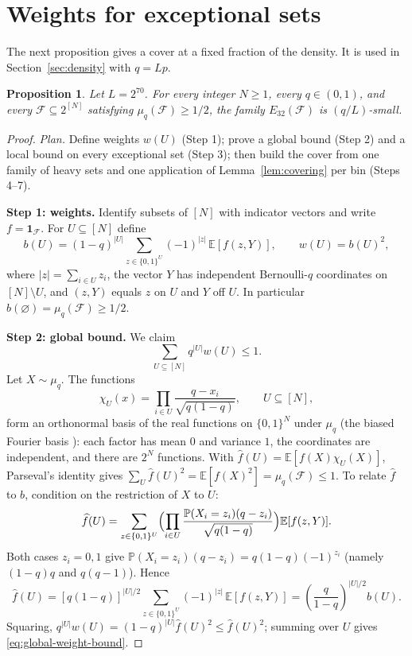 \documentclass[11pt,letterpaper]{article}
\newtheorem{proposition}[theorem]{Proposition}
\theoremstyle{definition}
\theoremstyle{remark}
\numberwithin{equation}{section}
\newcommand{\step}[1]{\par\smallskip\noindent\textbf{#1}\enspace}
\begin{document}
\section{Weights for exceptional sets}
\label{sec:weights}

The next proposition gives a cover at a fixed fraction of the density.
It is used in Section~\ref{sec:density} with $q=Lp$.

\begin{proposition}\label{prop:half-density}
Let $L=2^{70}$. For every integer $N\ge1$, every $q\in(0,1)$, and every
$\mathcal F\subseteq 2^{[N]}$ satisfying $\mu_q(\mathcal F)\ge1/2$,
the family $E_{32}(\mathcal F)$ is $(q/L)$-small.
\end{proposition}

\begin{proof}
\emph{Plan.} Define weights $w(U)$ (Step 1); prove a global bound
(Step 2) and a local bound on every exceptional set (Step 3); then build
the cover from one family of heavy sets and one application of
Lemma~\ref{lem:covering} per bin (Steps 4--7).

\step{Step 1: weights.}
Identify subsets of $[N]$ with indicator vectors and write
$f=\mathbf 1_{\mathcal F}$. For $U\subseteq[N]$ define
\begin{equation}\label{eq:weights-definition}
 b(U)=(1-q)^{|U|}
 \sum_{z\in\{0,1\}^{U}}(-1)^{|z|}\,
 \mathbb E[f(z,Y)],
 \qquad w(U)=b(U)^2,
\end{equation}
where $|z|=\sum_{i\in U}z_i$, the vector $Y$ has independent
Bernoulli-$q$ coordinates on $[N]\setminus U$, and $(z,Y)$ equals $z$ on
$U$ and $Y$ off $U$. In particular
$b(\varnothing)=\mu_q(\mathcal F)\ge1/2$.

\step{Step 2: global bound.} We claim
\begin{equation}\label{eq:global-weight-bound}
 \sum_{U\subseteq[N]}q^{|U|}w(U)\le1.
\end{equation}
Let $X\sim\mu_q$. The functions
\[
 \chi_U(x)=\prod_{i\in U}\frac{q-x_i}{\sqrt{q(1-q)}},
 \qquad U\subseteq[N],
\]
form an orthonormal basis of the real functions on $\{0,1\}^N$ under
$\mu_q$ (the biased Fourier basis \cite[Section~8.4]{ODonnell14}): each
factor has mean $0$ and variance $1$, the coordinates are independent,
and there are $2^N$ functions. With
$\widehat f(U)=\mathbb E[f(X)\chi_U(X)]$, Parseval's identity gives
$\sum_U\widehat f(U)^2=\mathbb E[f(X)^2]=\mu_q(\mathcal F)\le1$.
To relate $\widehat f$ to $b$, condition on the restriction of $X$ to $U$:
\[
 \widehat f(U)=\sum_{z\in\{0,1\}^U}
 \Bigl(\prod_{i\in U}\frac{\mathbb P(X_i=z_i)(q-z_i)}{\sqrt{q(1-q)}}\Bigr)
 \mathbb E[f(z,Y)].
\]
Both cases $z_i=0,1$ give
$\mathbb P(X_i=z_i)(q-z_i)=q(1-q)(-1)^{z_i}$ (namely $(1-q)q$ and
$q(q-1)$). Hence
\[
 \widehat f(U)
 =[q(1-q)]^{|U|/2}
 \sum_{z\in\{0,1\}^{U}}(-1)^{|z|}\,\mathbb E[f(z,Y)]
 =\left(\frac{q}{1-q}\right)^{|U|/2}b(U).
\]
Squaring, $q^{|U|}w(U)=(1-q)^{|U|}\widehat f(U)^2\le\widehat f(U)^2$;
summing over $U$ gives \eqref{eq:global-weight-bound}.


\end{proof}
\end{document}

